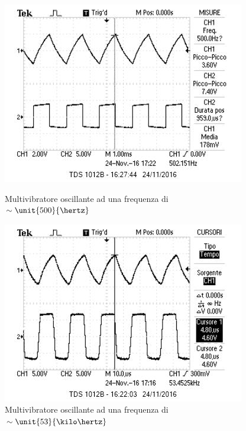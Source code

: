 \documentclass[10pt,a4paper]{article}
\begin{document}
{\begin{figure}[H]
    \centering
    \begin{minipage}{0.49\textwidth}
        \centering
        \includegraphics[width = \textwidth]{../oscilloscopio/fig2.jpg}
        \caption{Multivibratore oscillante ad una frequenza di $\sim \unit{500}{\hertz}$}
        \label{fig:fig2}
    \end{minipage}
    \begin{minipage}{0.49\textwidth}
        \centering
        \includegraphics[width = \textwidth]{../oscilloscopio/multivibratore_scazzo.jpg}
        \caption{Multivibratore oscillante ad una frequenza di $\sim \unit{53}{\kilo\hertz}$}
        \label{fig:multivibratore+}
    \end{minipage}
\end{figure}

}
\end{document}
